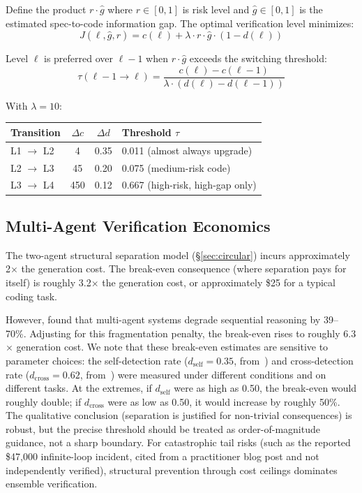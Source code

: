 \documentclass[11pt, a4paper, copyright]{googledeepmind}
\begin{document}
Define the product $r \cdot \hat{g}$ where $r \in [0,1]$ is risk level and $\hat{g} \in [0,1]$ is the estimated spec-to-code information gap.
The optimal verification level minimizes:
\begin{equation}
J(\ell, \hat{g}, r) = c(\ell) + \lambda \cdot r \cdot \hat{g} \cdot (1 - d(\ell))
\end{equation}

Level $\ell$ is preferred over $\ell - 1$ when $r \cdot \hat{g}$ exceeds the switching threshold:
\begin{equation}
\tau(\ell{-}1 \to \ell) = \frac{c(\ell) - c(\ell{-}1)}{\lambda \cdot (d(\ell) - d(\ell{-}1))}
\end{equation}

With $\lambda = 10$:

\begin{center}
\begin{tabular}{lccl}
\toprule
Transition & $\Delta c$ & $\Delta d$ & Threshold $\tau$ \\
\midrule
L1 $\to$ L2 & 4 & 0.35 & 0.011 (almost always upgrade) \\
L2 $\to$ L3 & 45 & 0.20 & 0.075 (medium-risk code) \\
L3 $\to$ L4 & 450 & 0.12 & 0.667 (high-risk, high-gap only) \\
\bottomrule
\end{tabular}
\end{center}

\subsection{Multi-Agent Verification Economics}

The two-agent structural separation model (\S\ref{sec:circular}) incurs approximately 2$\times$ the generation cost.
The break-even consequence (where separation pays for itself) is roughly 3.2$\times$ the generation cost, or approximately \$25 for a typical coding task.

However, \citet{google2025scaling} found that multi-agent systems degrade sequential reasoning by 39--70\%.
Adjusting for this fragmentation penalty, the break-even rises to roughly 6.3$\times$ generation cost.
We note that these break-even estimates are sensitive to parameter choices: the self-detection rate ($d_{\text{self}} = 0.35$, from~\citealt{selfverification2025}) and cross-detection rate ($d_{\text{cross}} = 0.62$, from~\citealt{hariharan2025plan}) were measured under different conditions and on different tasks.
At the extremes, if $d_{\text{self}}$ were as high as 0.50, the break-even would roughly double; if $d_{\text{cross}}$ were as low as 0.50, it would increase by roughly 50\%.
The qualitative conclusion (separation is justified for non-trivial consequences) is robust, but the precise threshold should be treated as order-of-magnitude guidance, not a sharp boundary.
For catastrophic tail risks (such as the reported \$47{,}000 infinite-loop incident, cited from a practitioner blog post and not independently verified), structural prevention through cost ceilings dominates ensemble verification.
\end{document}
